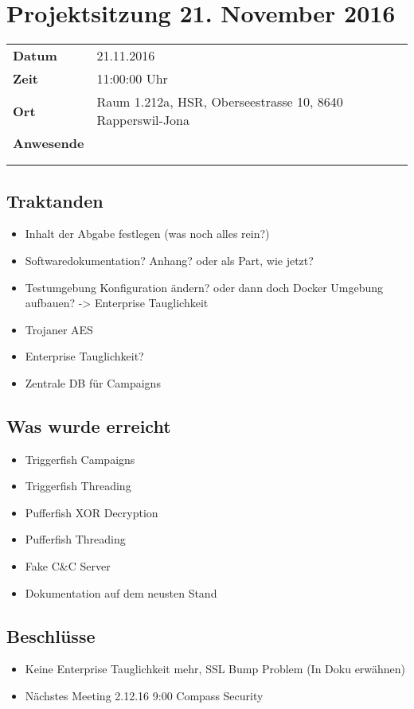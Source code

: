 \documentclass[class=scrbook,crop=false]{standalone}
\begin{document}
	\section{Projektsitzung 21. November 2016}

	\begin{tabular}{ll}
		\textbf{Datum} & 21.11.2016 \\
		\textbf{Zeit} & 11:00\textendash12:00 Uhr \\
		\textbf{Ort} & Raum 1.212a, HSR, Oberseestrasse 10, 8640 Rapperswil-Jona \\
		\textbf{Anwesende} & \ibuf \\ & \fbif \\ & \sadf
	\end{tabular}

	\subsection*{Traktanden}
	\begin{itemize}
		\item Inhalt der Abgabe festlegen (was noch alles rein?)
		\item Softwaredokumentation? Anhang? oder als Part, wie jetzt?
		\item Testumgebung Konfiguration ändern? oder dann doch Docker Umgebung aufbauen? -> Enterprise Tauglichkeit
		\item Trojaner AES
		\item Enterprise Tauglichkeit?
		\item Zentrale DB für Campaigns
	\end{itemize}

	\subsection*{Was wurde erreicht}
	\begin{itemize}
		\Item Erster Trojaner mit Testumgebung getestet
		\item Triggerfish Campaigns
		\item Triggerfish Threading
		\item Pufferfish XOR Decryption
		\item Pufferfish Threading
		\item Fake C\&C Server
		\item Dokumentation auf dem neusten Stand
	\end{itemize}

	\subsection*{Beschlüsse}
	\begin{itemize}
		\item Keine Enterprise Tauglichkeit mehr, SSL Bump Problem (In Doku erwähnen)
		\item Nächstes Meeting 2.12.16 9:00 Compass Security
	\end{itemize}
\end{document}
